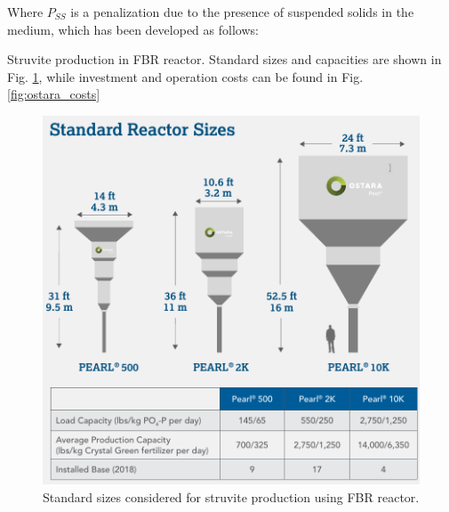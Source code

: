 \documentclass[10pt,a4paper]{article}
\begin{document}
Where $P_{SS}$ is a penalization due to the presence of suspended solids in the medium, which has been developed as follows:

Struvite production in FBR reactor. Standard sizes and capacities are shown in Fig. \ref{fig:ostara_sizes}, while investment and operation costs can be found in Fig. \ref{fig:ostara_costs}\cite{Pearl500cost1,Pearl2Kcost1,Pearl2Kcost2, Pearl10Kcost1,Pearl10Kcost2}

\begin{figure}[H]
	\centering
	\includegraphics[width=0.6\linewidth]{ostara_sizes} 
	\caption{Standard sizes considered for struvite production using FBR reactor.}
	\label{fig:ostara_sizes}
\end{figure}

\end{document}
